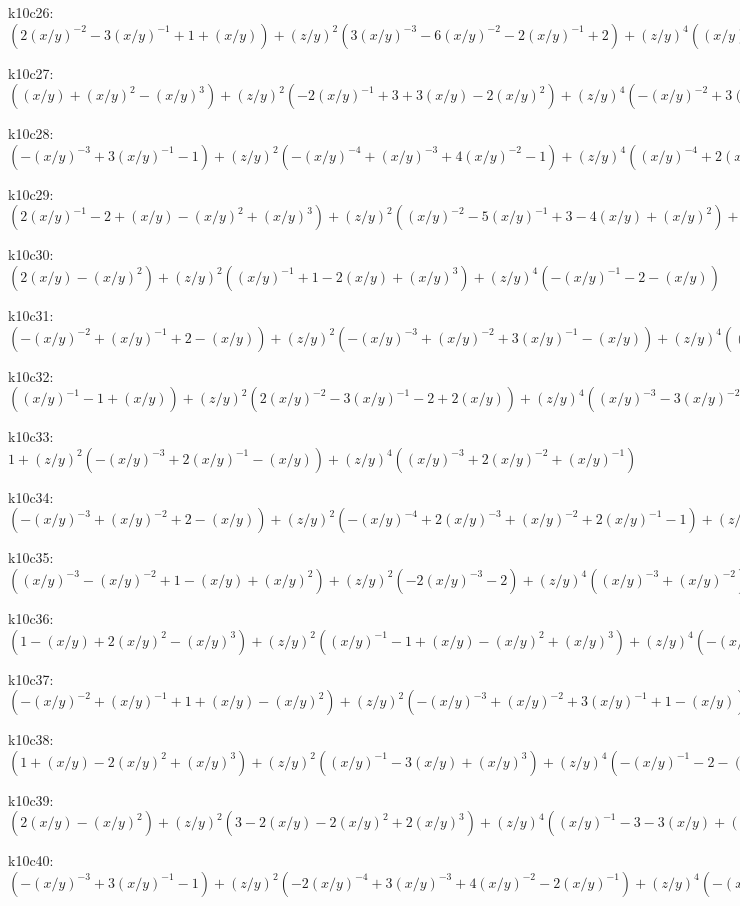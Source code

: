 k10c26: $ (2(x/y)^{-2}-3(x/y)^{-1}+1+(x/y))  +(z/y)^{2}(3(x/y)^{-3}-6(x/y)^{-2}-2(x/y)^{-1}+2)  +(z/y)^{4}((x/y)^{-4}-4(x/y)^{-3}-3(x/y)^{-2}+(x/y)^{-1})  +(z/y)^{6}(-(x/y)^{-4}-(x/y)^{-3}) $ 

k10c27: $ ((x/y)+(x/y)^{2}-(x/y)^{3})  +(z/y)^{2}(-2(x/y)^{-1}+3+3(x/y)-2(x/y)^{2})  +(z/y)^{4}(-(x/y)^{-2}+3(x/y)^{-1}+3-(x/y))  +(z/y)^{6}((x/y)^{-2}+(x/y)^{-1}) $ 

k10c28: $ (-(x/y)^{-3}+3(x/y)^{-1}-1)  +(z/y)^{2}(-(x/y)^{-4}+(x/y)^{-3}+4(x/y)^{-2}-1)  +(z/y)^{4}((x/y)^{-4}+2(x/y)^{-3}+(x/y)^{-2}) $ 

k10c29: $ (2(x/y)^{-1}-2+(x/y)-(x/y)^{2}+(x/y)^{3})  +(z/y)^{2}((x/y)^{-2}-5(x/y)^{-1}+3-4(x/y)+(x/y)^{2})  +(z/y)^{4}(-2(x/y)^{-2}+3(x/y)^{-1}-2)  +(x/y)^{-2}(z/y)^{6} $ 

k10c30: $ (2(x/y)-(x/y)^{2})  +(z/y)^{2}((x/y)^{-1}+1-2(x/y)+(x/y)^{3})  +(z/y)^{4}(-(x/y)^{-1}-2-(x/y)) $ 

k10c31: $ (-(x/y)^{-2}+(x/y)^{-1}+2-(x/y))  +(z/y)^{2}(-(x/y)^{-3}+(x/y)^{-2}+3(x/y)^{-1}-(x/y))  +(z/y)^{4}((x/y)^{-3}+2(x/y)^{-2}+(x/y)^{-1}) $ 

k10c32: $ ((x/y)^{-1}-1+(x/y))  +(z/y)^{2}(2(x/y)^{-2}-3(x/y)^{-1}-2+2(x/y))  +(z/y)^{4}((x/y)^{-3}-3(x/y)^{-2}-3(x/y)^{-1}+1)  +(z/y)^{6}(-(x/y)^{-3}-(x/y)^{-2}) $ 

k10c33: $ 1  +(z/y)^{2}(-(x/y)^{-3}+2(x/y)^{-1}-(x/y))  +(z/y)^{4}((x/y)^{-3}+2(x/y)^{-2}+(x/y)^{-1}) $ 

k10c34: $ (-(x/y)^{-3}+(x/y)^{-2}+2-(x/y))  +(z/y)^{2}(-(x/y)^{-4}+2(x/y)^{-3}+(x/y)^{-2}+2(x/y)^{-1}-1)  +(z/y)^{4}((x/y)^{-4}+(x/y)^{-3}+(x/y)^{-2}) $ 

k10c35: $ ((x/y)^{-3}-(x/y)^{-2}+1-(x/y)+(x/y)^{2})  +(z/y)^{2}(-2(x/y)^{-3}-2)  +(z/y)^{4}((x/y)^{-3}+(x/y)^{-2}) $ 

k10c36: $ (1-(x/y)+2(x/y)^{2}-(x/y)^{3})  +(z/y)^{2}((x/y)^{-1}-1+(x/y)-(x/y)^{2}+(x/y)^{3})  +(z/y)^{4}(-(x/y)^{-1}-1-(x/y)) $ 

k10c37: $ (-(x/y)^{-2}+(x/y)^{-1}+1+(x/y)-(x/y)^{2})  +(z/y)^{2}(-(x/y)^{-3}+(x/y)^{-2}+3(x/y)^{-1}+1-(x/y))  +(z/y)^{4}((x/y)^{-3}+2(x/y)^{-2}+(x/y)^{-1}) $ 

k10c38: $ (1+(x/y)-2(x/y)^{2}+(x/y)^{3})  +(z/y)^{2}((x/y)^{-1}-3(x/y)+(x/y)^{3})  +(z/y)^{4}(-(x/y)^{-1}-2-(x/y)) $ 

k10c39: $ (2(x/y)-(x/y)^{2})  +(z/y)^{2}(3-2(x/y)-2(x/y)^{2}+2(x/y)^{3})  +(z/y)^{4}((x/y)^{-1}-3-3(x/y)+(x/y)^{2})  +(z/y)^{6}(-(x/y)^{-1}-1) $ 

k10c40: $ (-(x/y)^{-3}+3(x/y)^{-1}-1)  +(z/y)^{2}(-2(x/y)^{-4}+3(x/y)^{-3}+4(x/y)^{-2}-2(x/y)^{-1})  +(z/y)^{4}(-(x/y)^{-5}+3(x/y)^{-4}+3(x/y)^{-3}-(x/y)^{-2})  +(z/y)^{6}((x/y)^{-5}+(x/y)^{-4}) $ 

